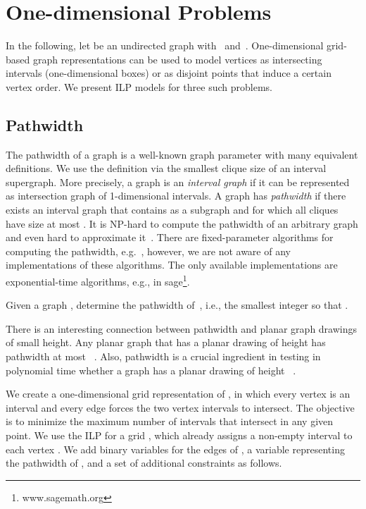 \documentclass[runningheads]{llncs}
\newcounter{constr}
\begin{document}
\section{One-dimensional Problems}
\label{se:problems:1dim}
In the following, let  be an undirected graph with~ and~. 
One-dimensional grid-based graph representations can be used to model vertices as intersecting intervals (one-dimensional boxes) or as disjoint points that induce a certain vertex order. We present ILP models for three such problems.


\subsection{Pathwidth}

The pathwidth of a graph  is a well-known graph
parameter with many equivalent definitions. We use the definition via the
smallest clique size of an interval supergraph.
More precisely, a graph is an {\em interval graph} if it can be
represented as intersection graph of 1-dimensional intervals.  A
graph  has {\em pathwidth}  if there exists an
interval graph  that contains  as a subgraph and for which all
cliques have size at most .
It is NP-hard to compute the pathwidth of an arbitrary graph and even
hard to approximate it~\cite{BodlaenderGKH91}. There are fixed-parameter algorithms for computing the pathwidth,
e.g.~\cite{BodlaenderK96}, however, we are not aware of any
implementations of these algorithms.  The only available implementations are exponential-time algorithms, 
e.g., in
sage\footnote{www.sagemath.org}. 

\begin{problem}[Pathwidth]\label{pb:pw}
	Given a graph , determine the pathwidth of~, i.e., the smallest integer  so that .
\end{problem}

There is an interesting connection between pathwidth and planar graph
drawings of small height.  Any planar graph that has a planar
drawing of height  has pathwidth at most ~\cite{FLW03}.
Also, pathwidth is a crucial ingredient in
testing in polynomial time whether a graph has a planar drawing of
height ~\cite{DFK+08}.

We create a one-dimensional grid representation of , in which every
vertex is an interval and every edge forces the two vertex intervals
to intersect. The objective is to minimize the maximum number of
intervals that intersect in any given point.
We use the ILP  for a grid , which
already assigns a non-empty interval to each vertex . We add
binary variables for the edges of , a variable 
representing the pathwidth of , and a set of additional
constraints as follows.
\end{document}
